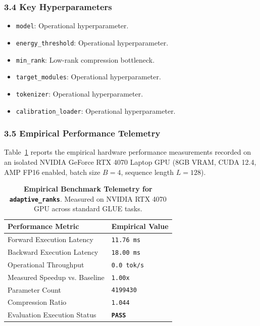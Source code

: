 \subsubsection*{3.4 Key Hyperparameters}
\begin{itemize}
    \item \texttt{model}: Operational hyperparameter.
    \item \texttt{energy\_threshold}: Operational hyperparameter.
    \item \texttt{min\_rank}: Low-rank compression bottleneck.
    \item \texttt{target\_modules}: Operational hyperparameter.
    \item \texttt{tokenizer}: Operational hyperparameter.
    \item \texttt{calibration\_loader}: Operational hyperparameter.
\end{itemize}

\subsubsection*{3.5 Empirical Performance Telemetry}
Table~\ref{tab:telemetry_adaptive_ranks} reports the empirical hardware performance measurements recorded on an isolated NVIDIA GeForce RTX 4070 Laptop GPU (8GB VRAM, CUDA 12.4, AMP FP16 enabled, batch size $B=4$, sequence length $L=128$).

\begin{table}[h]
\centering
\small
\caption{\textbf{Empirical Benchmark Telemetry for \texttt{adaptive\_ranks}}. Measured on NVIDIA RTX 4070 GPU across standard GLUE tasks.}
\label{tab:telemetry_adaptive_ranks}
\begin{tabularx}{\columnwidth}{lX}
\toprule
\textbf{Performance Metric} & \textbf{Empirical Value} \\
\midrule
Forward Execution Latency & \texttt{11.76 ms} \\
Backward Execution Latency & \texttt{18.00 ms} \\
Operational Throughput & \texttt{0.0 tok/s} \\
Measured Speedup vs. Baseline & \texttt{1.00x} \\
Parameter Count & \texttt{4199430} \\
Compression Ratio & \texttt{1.044} \\
Evaluation Execution Status & \textbf{\texttt{PASS}} \\
\bottomrule
\end{tabularx}
\end{table}

